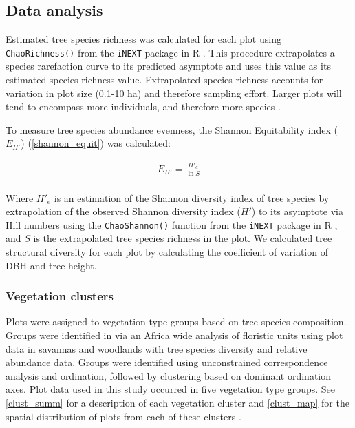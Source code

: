 \documentclass[11pt,a4paper]{article}
\begin{document}
% 
% 

\subsection{Data analysis}
Estimated tree species richness was calculated for each plot using \verb|ChaoRichness()| from the \verb|iNEXT| package in R \citep{Hsieh2016}. This procedure extrapolates a species rarefaction curve to its predicted asymptote and uses this value as its estimated species richness value. Extrapolated species richness accounts for variation in plot size (0.1-10 ha) and therefore sampling effort. Larger plots will tend to encompass more individuals, and therefore more species \citep{Dengler2009}.

To measure tree species abundance evenness, the Shannon Equitability index ($E_{H'}$) \citep{Smith1996} (\autoref{shannon_equit}) was calculated: 

\begin{equation}
	\begin{gathered}
		E_{H'} = \frac{H'_{e}}{\ln{S}} \\
	\end{gathered}
	\label{shannon_equit}
\end{equation}

Where $H'_{e}$ is an estimation of the Shannon diversity index of tree species by extrapolation of the observed Shannon diversity index ($H'$) to its asymptote via Hill numbers using the \verb|ChaoShannon()| function from the \verb|iNEXT| package in R \citep{Hsieh2016}, and $S$ is the extrapolated tree species richness in the plot. We calculated tree structural diversity for each plot by calculating the coefficient of variation of DBH and tree height. 

\subsubsection{Vegetation clusters}

Plots were assigned to vegetation type groups based on tree species composition. Groups were identified in \citet{Fayolle2018} via an Africa wide analysis of floristic units using plot data in savannas and woodlands with tree species diversity and relative abundance data. Groups were identified using unconstrained correspondence analysis and ordination, followed by clustering based on dominant ordination axes. Plot data used in this study occurred in five vegetation type groups. See \autoref{clust_summ} for a description of each vegetation cluster and \autoref{clust_map} for the spatial distribution of plots from each of these clusters .
\end{document}
